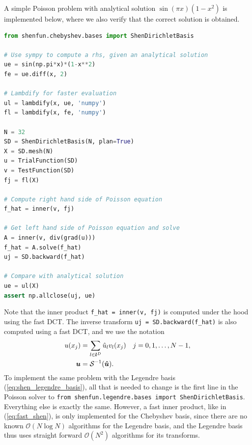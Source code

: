 \documentclass[%
oneside,                 %
final,                   %
10pt]{article}
\theoremstyle{definition}
\begin{document}
A simple Poisson problem with analytical solution $\sin(\pi x)(1-x^2)$ is implemented below, where we also verify that the correct solution is obtained.
\begin{lstlisting}[language=Python,style=yellow2_fb]
from shenfun.chebyshev.bases import ShenDirichletBasis

# Use sympy to compute a rhs, given an analytical solution
ue = sin(np.pi*x)*(1-x**2)
fe = ue.diff(x, 2)

# Lambdify for faster evaluation
ul = lambdify(x, ue, 'numpy')
fl = lambdify(x, fe, 'numpy')

N = 32
SD = ShenDirichletBasis(N, plan=True)
X = SD.mesh(N)
u = TrialFunction(SD)
v = TestFunction(SD)
fj = fl(X)

# Compute right hand side of Poisson equation
f_hat = inner(v, fj)

# Get left hand side of Poisson equation and solve
A = inner(v, div(grad(u)))
f_hat = A.solve(f_hat)
uj = SD.backward(f_hat)

# Compare with analytical solution
ue = ul(X)
assert np.allclose(uj, ue)
\end{lstlisting}
Note that the inner product \Verb!f_hat = inner(v, fj)! is computed under the hood using the fast DCT.  The inverse transform \Verb!uj = SD.backward(f_hat)! is also computed using a fast DCT, and we use the notation
\begin{align}
u(x_j) &= \sum_{l\in \boldsymbol{l}^D} \hat{u}_l v_l(x_j) \quad j=0,1,\ldots, N-1, \notag \\ 
\boldsymbol{u} &= \mathcal{S}^{-1}(\boldsymbol{\hat{u}}). \label{eq:fast_shen}
\end{align}
To implement the same problem with the Legendre basis (\ref{eq:shen_legendre_basis}), all that is needed to change is the first line in the Poisson solver to \texttt{from shenfun.legendre.bases import ShenDirichletBasis}. Everything else is exactly the same. However, a fast inner product, like in (\ref{eq:fast_shen}), is only implemented for the Chebyshev basis, since there are no known $\mathcal{O}(N \log N)$ algorithms for the Legendre basis, and the Legendre basis thus uses straight forward $\mathcal{O}(N^2)$ algorithms for its transforms.

\end{document}
